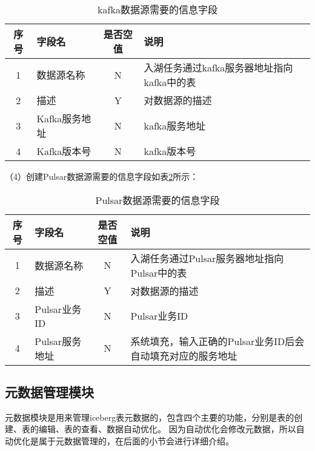 \begin{table}[H]
  \centering
  \caption{kafka数据源需要的信息字段}
  \label{tab:kafka数据源需要的信息字段}
  \begin{tabular}{clcl}
    \toprule
    序号  & 字段名     & 是否空值   & 说明                                      \\
    \midrule
    1    & 数据源名称  & N        & 入湖任务通过kafka服务器地址指向kafka中的表 \\
    2    & 描述       & Y        & 对数据源的描述                               \\
    3    & Kafka服务地址    & N        & kafka服务地址                           \\
    4    & Kafka版本号      & N        &  kafka版本号       \\
    \bottomrule
  \end{tabular}
\end{table}

（4）创建Pulsar数据源需要的信息字段如表\ref{tab:Pulsar数据源需要的信息字段}所示：

\begin{table}[H]
  \centering
  \caption{Pulsar数据源需要的信息字段}
  \label{tab:Pulsar数据源需要的信息字段}
  \begin{tabular}{clcl}
    \toprule
    序号  & 字段名     & 是否空值   & 说明                                      \\
    \midrule
    1    & 数据源名称  & N        & 入湖任务通过Pulsar服务器地址指向Pulsar中的表 \\
    2    & 描述       & Y        & 对数据源的描述                               \\
    3    & Pulsar业务ID    & N        & Pulsar业务ID                          \\
    4    & Pulsar服务地址      & N        &  系统填充，输入正确的Pulsar业务ID后会自动填充对应的服务地址      \\
    \bottomrule
  \end{tabular}
\end{table}

\subsection{元数据管理模块}

元数据模块是用来管理iceberg表元数据的，包含四个主要的功能，分别是表的创建、表的编辑、表的查看、数据自动优化。
因为自动优化会修改元数据，所以自动优化是属于元数据管理的，在后面的小节会进行详细介绍。

